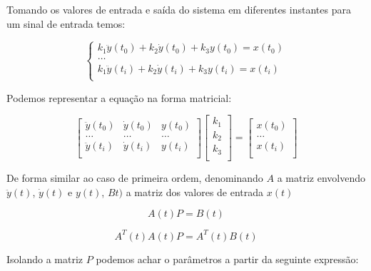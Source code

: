 \documentclass[a4paper,11pt]{article}
\begin{document}
Tomando os valores de entrada e saída do sistema em diferentes instantes para um sinal de entrada temos:

\begin{equation}
\left\{\begin{array}{c}
    k_1 \ddot{y}(t_0) + k_2 \dot{y}(t_0) + k_3 y(t_0) = x(t_0)  \\
    \dots\\
    k_1 \ddot{y}(t_i) + k_2 \dot{y}(t_i) + k_3 y(t_i) = x(t_i)  \\
\end{array} \right.
\end{equation}


Podemos representar a equação na forma matricial:

\begin{equation}
\left[\begin{array}{ccc}
    \ddot{y}(t_0) & \dot{y}(t_0) & y(t_0)\\
    \dots  & \dots & \dots \\
    \ddot{y}(t_i) & \dot{y}(t_i) & y(t_i)\\
\end{array} \right]
\left[\begin{array}{c}
    k_1\\
    k_2\\
    k_3\\
\end{array} \right]
=
\left[\begin{array}{c}
    x(t_0)  \\
    \dots\\
    x(t_i)  \\
\end{array} \right]
\end{equation}


De forma similar ao caso de primeira ordem, denominando $A$ a matriz envolvendo $\ddot{y}(t)$, $\dot{y}(t)$ e $y(t)$, $Bt)$ a matriz dos valores de entrada $x(t)$

\begin{equation}
    A(t) P = B(t)
\end{equation}

\begin{equation}
    A^T(t)A(t) P = A^T(t) B(t)
\end{equation}

Isolando a matriz $P$ podemos achar o parâmetros a partir da seguinte expressão:
\end{document}
